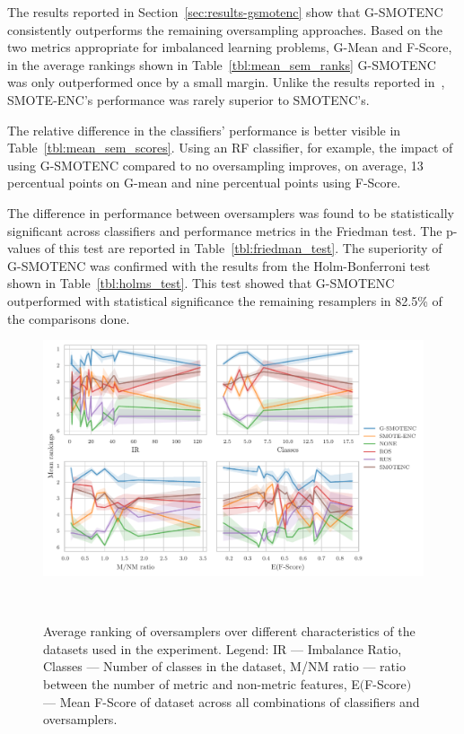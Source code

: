 The results reported in Section~\ref{sec:results-gsmotenc} show that G-SMOTENC
consistently outperforms the remaining oversampling approaches. Based on the
two metrics appropriate for imbalanced learning problems, G-Mean and F-Score,
in the average rankings shown in Table~\ref{tbl:mean_sem_ranks} G-SMOTENC was
only outperformed once by a small margin. Unlike the results reported
in~\cite{mukherjee2021smote}, SMOTE-ENC's performance was rarely superior to
SMOTENC's.

The relative difference in the classifiers' performance is better visible in
Table~\ref{tbl:mean_sem_scores}. Using an RF classifier, for example, the
impact of using G-SMOTENC compared to no oversampling improves, on average, 13
percentual points on G-mean and nine percentual points using F-Score. 

The difference in performance between oversamplers was found to be
statistically significant across classifiers and performance metrics in the
Friedman test. The p-values of this test are reported in
Table~\ref{tbl:friedman_test}. The superiority of G-SMOTENC was confirmed with
the results from the Holm-Bonferroni test shown in Table~\ref{tbl:holms_test}.
This test showed that G-SMOTENC outperformed with statistical significance the
remaining resamplers in 82.5\% of the comparisons done.

\begin{figure}[ht]
	\centering
	\includegraphics[width=\linewidth]{consistency_analysis_plot}
    \caption[Average ranking of oversamplers over different characteristics of
        the datasets used in the experiment.]{%
            Average ranking of oversamplers over different characteristics of
            the datasets used in the experiment. Legend: IR --- Imbalance
            Ratio, Classes --- Number of classes in the dataset, M/NM ratio
            --- ratio between the number of metric and non-metric features,
            E$($F-Score$)$ --- Mean F-Score of dataset across all combinations
            of classifiers and oversamplers.
    }~\label{fig:consistency_analysis}
\end{figure}


